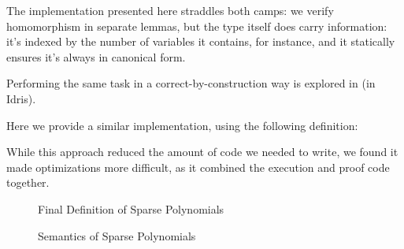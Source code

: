 \documentclass[draft, twocolumn]{article}
\theoremstyle{definition}
\theoremstyle{definition}
\begin{document}
The implementation presented here straddles both camps: we verify homomorphism
in separate lemmas, but the type itself does carry information: it's indexed by
the number of variables it contains, for instance, and it statically ensures
it's always in canonical form.

Performing the same task in a correct-by-construction way is explored
in\cite{geuvers_automatically_2017} (in Idris\cite{brady_idris_2013}).

Here we provide a similar implementation, using the following definition:

While this approach reduced the amount of code we needed to write, we found it
made optimizations more difficult, as it combined the execution and proof code
together.


\appendix
\begin{figure}
  \caption{Final Definition of Sparse Polynomials}
  \label{final-poly-def}
\end{figure}
\begin{figure}
  \caption{Semantics of Sparse Polynomials}
  \label{semantics}
\end{figure}
\end{document}

